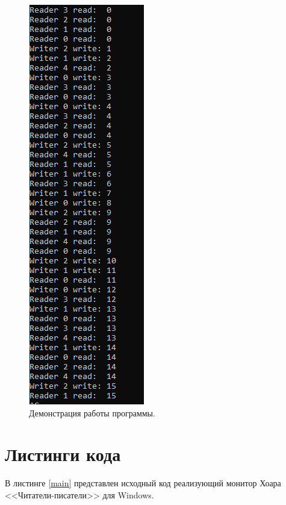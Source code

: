 \documentclass[12pt]{report}
\begin{document}
\begin{figure}[H]

	\centering

	\includegraphics[scale=0.7]{img/read-write-01.png}
	\caption{Демонстрация работы программы.}
	\label{fig:task01}
\end{figure}

\section{Листинги кода}

В листинге \ref{main} представлен исходный код реализующий монитор Хоара <<Читатели-писатели>> для Windows.
\end{document}
